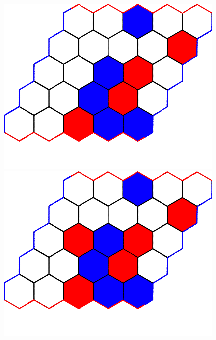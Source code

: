 \documentclass[a4paper]{article}
\begin{document}
\begin{figure}[t]
\begin{minipage}[t]{.24\linewidth}
    \includegraphics[width=\linewidth]{figures/example_game/ex_game_t9.png}
    \end{minipage}
    \begin{minipage}[t]{.24\linewidth}
    \includegraphics[width=\linewidth]{figures/example_game/ex_game_t10.png}
    \end{minipage}
    \begin{minipage}[t]{.24\linewidth}

\end{minipage}
\end{figure}
\end{document}
